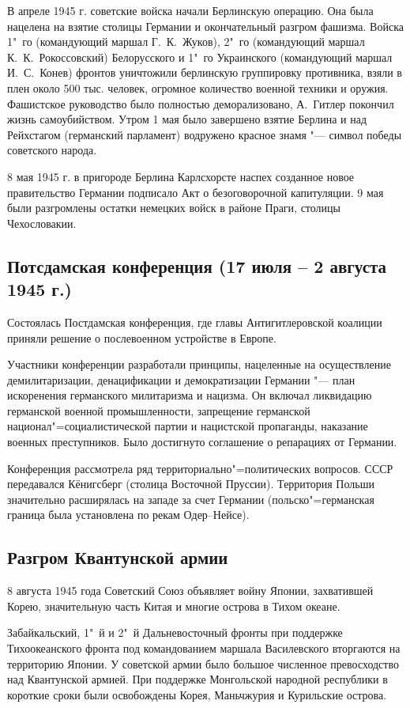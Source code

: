В апреле 1945 г. советские войска начали Берлинскую операцию.
Она была нацелена на взятие столицы Германии и окончательный разгром фашизма. Войска 1"~го (командующий маршал Г.~К.~Жуков), 2"~го (командующий маршал К.~К.~Рокоссовский) Белорусского и 1"~го Украинского (командующий маршал И.~С.~Конев) фронтов уничтожили берлинскую группировку противника, взяли в плен около 500 тыс. человек,
огромное количество военной техники и оружия. Фашистское руководство было полностью деморализовано, А.~Гитлер покончил жизнь самоубийством. Утром 1 мая было завершено взятие Берлина и над Рейхстагом (германский парламент) водружено красное знамя "--- символ победы советского народа.

8 мая 1945 г. в пригороде Берлина Карлсхорсте наспех созданное новое правительство Германии подписало Акт о безоговорочной капитуляции. 9 мая были разгромлены остатки немецких войск в районе Праги, столицы Чехословакии. 

\subsection{Потсдамская конференция (17 июля -- 2 августа 1945 г.)}

Состоялась Постдамская конференция, где главы Антигитлеровской коалиции приняли решение о послевоенном устройстве в Европе.

Участники конференции разработали принципы, нацеленные на осуществление демилитаризации, денацификации и демократизации Германии "--- план искоренения германского милитаризма и нацизма. Он включал ликвидацию германской военной промышленности, запрещение германской национал"=социалистической партии и нацистской пропаганды, наказание военных преступников. Было достигнуто соглашение о репарациях от Германии.

Конференция рассмотрела ряд территориально"=политических вопросов. СССР передавался Кёнигсберг (столица Восточной Пруссии). Территория Польши значительно расширялась на западе за счет Германии (польско"=германская граница была установлена по рекам Одер--Нейсе). 

\subsection{Разгром Квантунской армии}

8 августа 1945 года Советский Союз объявляет войну Японии, захватившей Корею, значительную часть Китая и многие острова в Тихом океане.

Забайкальский, 1"~й и 2"~й Дальневосточный фронты при поддержке Тихоокеанского фронта под командованием маршала Василевского вторгаются на территорию Японии. У советской армии было большое численное превосходство над Квантунской армией. При поддержке Монгольской народной республики в короткие сроки были освобождены Корея, Маньчжурия и Курильские острова.

